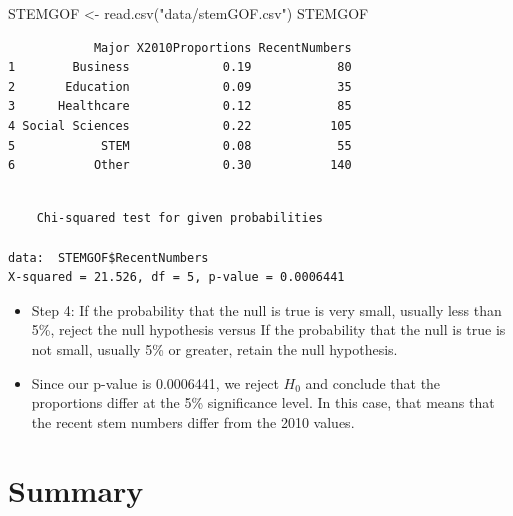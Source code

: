 \documentclass[
  letterpaper,
  DIV=11,
  numbers=noendperiod]{scrreprt}
\newenvironment{Shaded}{\begin{snugshade}}{\end{snugshade}}
\newcommand{\AttributeTok}[1]{\textcolor[rgb]{0.40,0.45,0.13}{#1}}
\newcommand{\FunctionTok}[1]{\textcolor[rgb]{0.28,0.35,0.67}{#1}}
\newcommand{\NormalTok}[1]{\textcolor[rgb]{0.00,0.23,0.31}{#1}}
\newcommand{\OtherTok}[1]{\textcolor[rgb]{0.00,0.23,0.31}{#1}}
\newcommand{\SpecialCharTok}[1]{\textcolor[rgb]{0.37,0.37,0.37}{#1}}
\newcommand{\StringTok}[1]{\textcolor[rgb]{0.13,0.47,0.30}{#1}}
\providecommand{\tightlist}{%
  \setlength{\itemsep}{0pt}\setlength{\parskip}{0pt}}\usepackage{longtable,booktabs,array}
\begin{document}
\begin{Shaded}
\begin{Highlighting}[]
\NormalTok{STEMGOF }\OtherTok{\textless{}{-}} \FunctionTok{read.csv}\NormalTok{(}\StringTok{"data/stemGOF.csv"}\NormalTok{)}
\NormalTok{STEMGOF}
\end{Highlighting}
\end{Shaded}

\begin{verbatim}
            Major X2010Proportions RecentNumbers
1        Business             0.19            80
2       Education             0.09            35
3      Healthcare             0.12            85
4 Social Sciences             0.22           105
5            STEM             0.08            55
6           Other             0.30           140
\end{verbatim}

\begin{Shaded}
\end{Shaded}

\begin{verbatim}

    Chi-squared test for given probabilities

data:  STEMGOF$RecentNumbers
X-squared = 21.526, df = 5, p-value = 0.0006441
\end{verbatim}

\begin{itemize}
\tightlist
\item
  Step 4: If the probability that the null is true is very small,
  usually less than 5\%, reject the null hypothesis versus If the
  probability that the null is true is not small, usually 5\% or
  greater, retain the null hypothesis.
\item
  Since our p-value is 0.0006441, we reject \(H_0\) and conclude that
  the proportions differ at the 5\% significance level. In this case,
  that means that the recent stem numbers differ from the 2010 values.
\end{itemize}


\chapter{Summary}\label{summary-6}
\end{document}

